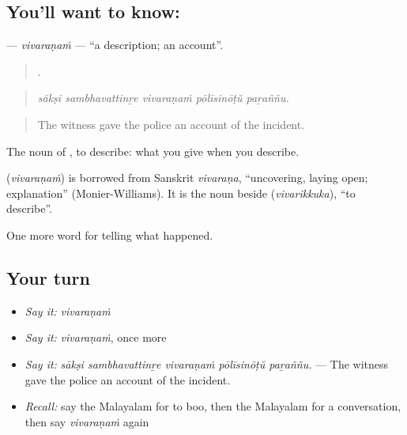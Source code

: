 \subsection*{You'll want to know: }
\textbf{} — \emph{vivaraṇaṁ} — \textquotedblleft{}a description; an account\textquotedblright{}.

\begin{quote}
    .
\end{quote}

\begin{quote}
\emph{sākṣi sambhavattinṟe vivaraṇaṁ pōlīsinōṭŭ paṟaññu.}
\end{quote}

\begin{quote}
The witness gave the police an account of the incident.
\end{quote}

The noun of , to describe: what you give when you describe.

\begin{cousinweb}
\textbf{} (\emph{vivaraṇaṁ}) is borrowed from Sanskrit \emph{vivaraṇa}, \textquotedblleft{}uncovering, laying open; explanation\textquotedblright{} (Monier-Williams). It is the noun beside  (\emph{vivarikkuka}), \textquotedblleft{}to describe\textquotedblright{}.
\end{cousinweb}

\begin{grammarlens}[title={What you've built}]
One more word for telling what happened.
\end{grammarlens}

\subsection*{Your turn}
\begin{itemize}
\raggedright
  \item \emph{Say it:} \emph{vivaraṇaṁ}
  \item \emph{Say it:} \emph{vivaraṇaṁ}, once more
  \item \emph{Say it:} \emph{sākṣi sambhavattinṟe vivaraṇaṁ pōlīsinōṭŭ paṟaññu.} — The witness gave the police an account of the incident.
  \item \emph{Recall:} say the Malayalam for to boo, then the Malayalam for a conversation, then say \emph{vivaraṇaṁ} again
\end{itemize}

